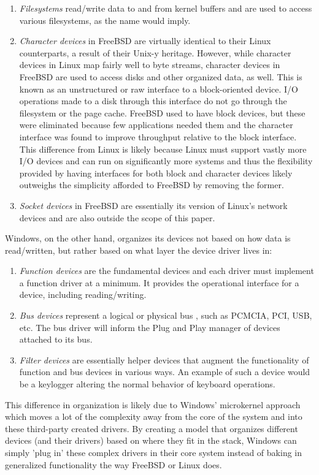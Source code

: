 \documentclass[onecolumn, draftclsnofoot,10pt, compsoc]{IEEEtran}
\begin{document}
\begin{enumerate}
\item \textit{Filesystems} read/write data to and from kernel buffers and are used to access various filesystems, as the name would imply.
\item \textit{Character devices} in FreeBSD are virtually identical to their Linux counterparts, a result of their Unix-y heritage. However, while character devices in Linux map fairly well to byte streams, character devices in FreeBSD are used to access disks and other organized data, as well. This is known as an unstructured or raw interface to a block-oriented device. I/O operations made to a disk through this interface do not go through the filesystem or the page cache. FreeBSD used to have block devices, but these were eliminated because few applications needed them and the character interface was found to improve throughput relative to the block interface. This difference from Linux is likely because Linux must support vastly more I/O devices and can run on significantly more systems and thus the flexibility provided by having interfaces for both block and character devices likely outweighs the simplicity afforded to FreeBSD by removing the former.
\item \textit{Socket devices} in FreeBSD are essentially its version of Linux's network devices and are also outside the scope of this paper.
\end{enumerate}
Windows, on the other hand, organizes its devices not based on how data is read/written, but rather based on what layer the device driver lives in:
\begin{enumerate}
\item \textit{Function devices} are the fundamental devices and each driver must implement a function driver at a minimum. It provides the operational interface for a device, including reading/writing.
\item \textit{Bus devices} represent a logical or physical bus \cite{WindowsInternals2}, such as PCMCIA, PCI, USB, etc. The bus driver will inform the Plug and Play manager of devices attached to its bus.
\item \textit{Filter devices} are essentially helper devices that augment the functionality of function and bus devices in various ways. An example of such a device would be a keylogger altering the normal behavior of keyboard operations.
\end{enumerate}
This difference in organization is likely due to Windows' microkernel approach which moves a lot of the complexity away from the core of the system and into these third-party created drivers. By creating a model that organizes different devices (and their drivers) based on where they fit in the stack, Windows can simply 'plug in' these complex drivers in their core system instead of baking in generalized functionality the way FreeBSD or Linux does.
\end{document}
